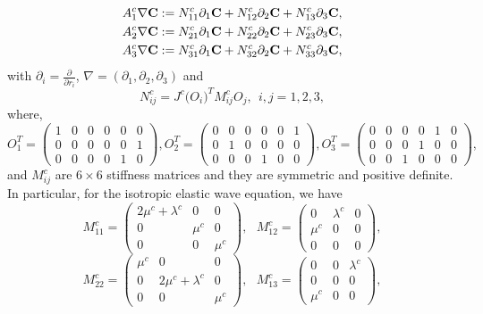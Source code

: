 \begin{align*} 
	A_1^c\nabla{\bf C} &:= N_{11}^c\partial_1{\bf C} + N_{12}^c\partial_2{\bf C} + N_{13}^c\partial_3{\bf C}, \\
	A_2^c\nabla{\bf C} &:= N_{21}^c\partial_1{\bf C} + N_{22}^c\partial_2{\bf C} + N_{23}^c\partial_3{\bf C}, \\
	A_3^c\nabla{\bf C} &:= N_{31}^c\partial_1{\bf C} + N_{32}^c\partial_2{\bf C} + N_{33}^c\partial_3{\bf C},
\end{align*}
with $\partial_i = \frac{\partial}{\partial r_i}$, $\nabla = (\partial_1,\partial_2,\partial_3)$ and
\begin{equation}\label{N_definition}
	N_{ij}^c = J^c\big(O_i\big)^TM_{ij}^cO_j, \ \ i,j = 1,2,3,
\end{equation}
where, 
\[ O_{1}^T = \left(\begin{array}{cccccc}
1 & 0 & 0 &0 & 0 & 0\\
0 & 0 & 0 &0 & 0 & 1\\
0 & 0 & 0 &0 & 1 & 0\end{array}\right),  O_{2}^T = \left(\begin{array}{cccccc}
0 & 0 & 0 &0 & 0 & 1\\
0 & 1 & 0 &0 & 0 & 0\\
0 & 0 & 0 &1 & 0 & 0\end{array}\right),  O_{3}^T = \left(\begin{array}{cccccc}
0 & 0 & 0 &0 & 1 & 0\\
0 & 0 & 0 &1 & 0 & 0\\
0 & 0 & 1 &0 & 0 & 0\end{array}\right),\]
and $M_{ij}^c$ are $6\times 6$ stiffness matrices and they are symmetric and positive definite. In particular, for the isotropic elastic wave equation, we have
\[ M_{11}^c = \left(\begin{array}{ccc}
2\mu^c+\lambda^c & 0 & 0\\
0 & \mu^c & 0\\
0 & 0 & \mu^c\end{array}\right),\ \ \  M_{12}^c = \left(\begin{array}{ccc}
0 & \lambda^c & 0\\
\mu^c & 0 & 0\\
0 & 0 & 0\end{array}\right), \]
\begin{equation}\label{M_definition}
M_{22}^c = \left(\begin{array}{ccc}
\mu^c & 0 & 0\\
0 & 2\mu^c+\lambda^c & 0\\
0 & 0 & \mu^c\end{array}\right),\ \ \ M_{13}^c = \left(\begin{array}{ccc}
0 & 0 & \lambda^c\\
0 & 0 & 0\\
\mu^c & 0 & 0\end{array}\right),
\end{equation}
